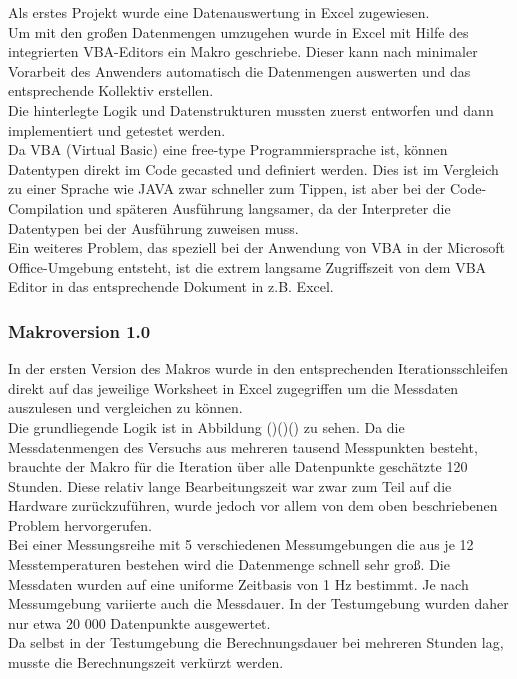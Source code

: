 Als erstes Projekt wurde eine Datenauswertung in Excel zugewiesen. \\
Um mit den großen Datenmengen umzugehen wurde in Excel mit Hilfe des integrierten VBA-Editors ein Makro geschriebe. Dieser kann nach minimaler Vorarbeit des Anwenders automatisch die Datenmengen auswerten und das entsprechende Kollektiv erstellen. \\
Die hinterlegte Logik und Datenstrukturen mussten zuerst entworfen und dann implementiert und getestet werden. \\
Da VBA (Virtual Basic) eine free-type Programmiersprache ist, können Datentypen direkt im Code gecasted und definiert werden. Dies ist im Vergleich zu einer Sprache wie JAVA zwar schneller zum Tippen, ist aber bei der Code-Compilation und späteren Ausführung langsamer, da der Interpreter die Datentypen bei der Ausführung zuweisen muss. \\
Ein weiteres Problem, das speziell bei der Anwendung von VBA in der Microsoft Office-Umgebung entsteht, ist die extrem langsame Zugriffszeit von dem VBA Editor in das entsprechende Dokument in z.B. Excel.\\

\subsubsection{Makroversion 1.0}
\label{Makro1.0}

In der ersten Version des Makros wurde in den entsprechenden Iterationsschleifen direkt auf das jeweilige Worksheet in Excel zugegriffen um die Messdaten auszulesen und vergleichen zu können. \\
Die grundliegende Logik ist in Abbildung ()()() zu sehen.
Da die Messdatenmengen des Versuchs aus mehreren tausend Messpunkten besteht, brauchte der Makro für die Iteration über alle Datenpunkte geschätzte 120 Stunden. Diese relativ lange Bearbeitungszeit war zwar zum Teil auf die Hardware zurückzuführen, wurde jedoch vor allem von dem oben beschriebenen Problem hervorgerufen. \\
Bei einer Messungsreihe mit 5 verschiedenen Messumgebungen die aus je 12 Messtemperaturen bestehen wird die Datenmenge schnell sehr groß. Die Messdaten wurden auf eine uniforme Zeitbasis von 1 Hz bestimmt. Je nach Messumgebung variierte auch die Messdauer. In der Testumgebung wurden daher nur etwa 20 000 Datenpunkte ausgewertet.\\

Da selbst in der Testumgebung die Berechnungsdauer bei mehreren Stunden lag, musste die Berechnungszeit verkürzt werden.

